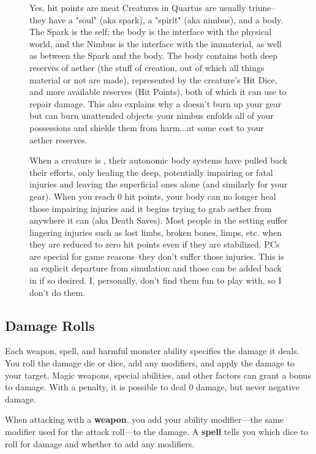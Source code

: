 \begin{figure}
    \begin{DndComment}{Yes, hit points are meat}
        Creatures in Quartus are usually triune--they have a "soul" (aka spark), a "spirit" (aka nimbus), and a body. The Spark is the self; the body is the interface with the physical world, and the Nimbus is the interface with the immaterial, as well as between the Spark and the body. The body contains both deep reserves of aether (the stuff of creation, out of which all things material or not are made), represented by the creature's Hit Dice, and more available reserves (Hit Points), both of which it can use to repair damage. This also explains why a  doesn't burn up your gear but can burn unattended objects--your nimbus enfolds all of your possessions and shields them from harm...at some cost to your aether reserves.

        When a creature is , their autonomic body systems have pulled back their efforts, only healing the deep, potentially impairing or fatal injuries and leaving the superficial ones alone (and similarly for your gear). When you reach 0 hit points, your body can no longer heal those impairing injuries and it begins trying to grab aether from anywhere it can (aka Death Saves). Most people in the setting suffer lingering injuries such as lost limbs, broken bones, limps, etc. when they are reduced to zero hit points even if they are stabilized. PCs are special for game reasons--they don't suffer those injuries. This is an explicit departure from simulation and those can be added back in if so desired. I, personally, don't find them fun to play with, so I don't do them.
    \end{DndComment}
\end{figure}

\subsection{Damage Rolls}

Each weapon, spell, and harmful monster ability specifies the damage it deals. You roll the damage die or dice, add any modifiers, and apply the damage to your target. Magic weapons, special abilities, and other factors can grant a bonus to damage. With a penalty, it is possible to deal 0 damage, but never negative damage.

When attacking with a \textbf{weapon}, you add your ability modifier—the same modifier used for the attack roll—to the damage. A \textbf{spell} tells you which dice to roll for damage and whether to add any modifiers.

